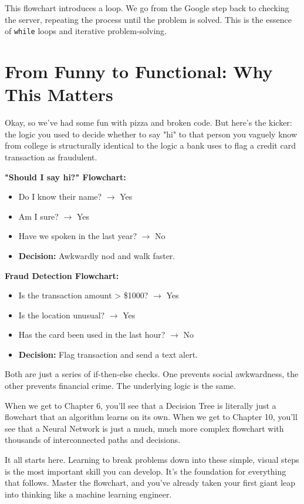 \documentclass[11pt, letterpaper, openany]{book}
\begin{document}
This flowchart introduces a loop. We go from the Google step back to checking the server, repeating the process until the problem is solved. This is the essence of \texttt{while} loops and iterative problem-solving.

\section{From Funny to Functional: Why This Matters}

Okay, so we've had some fun with pizza and broken code. But here's the kicker: the logic you used to decide whether to say "hi" to that person you vaguely know from college is structurally identical to the logic a bank uses to flag a credit card transaction as fraudulent.

\textbf{"Should I say hi?" Flowchart:}
\begin{itemize}
    \item Do I know their name? $\rightarrow$ Yes
    \item Am I sure? $\rightarrow$ Yes
    \item Have we spoken in the last year? $\rightarrow$ No
    \item \textbf{Decision:} Awkwardly nod and walk faster.
\end{itemize}

\textbf{Fraud Detection Flowchart:}
\begin{itemize}
    \item Is the transaction amount > \$1000? $\rightarrow$ Yes
    \item Is the location unusual? $\rightarrow$ Yes
    \item Has the card been used in the last hour? $\rightarrow$ No
    \item \textbf{Decision:} Flag transaction and send a text alert.
\end{itemize}

Both are just a series of if-then-else checks. One prevents social awkwardness, the other prevents financial crime. The underlying logic is the same.

When we get to Chapter 6, you'll see that a Decision Tree is literally just a flowchart that an algorithm learns on its own. When we get to Chapter 10, you'll see that a Neural Network is just a much, much more complex flowchart with thousands of interconnected paths and decisions.

It all starts here. Learning to break problems down into these simple, visual steps is the most important skill you can develop. It's the foundation for everything that follows. Master the flowchart, and you've already taken your first giant leap into thinking like a machine learning engineer.
\end{document}
